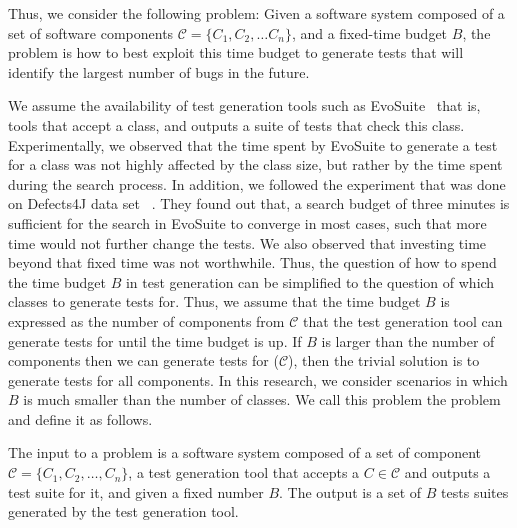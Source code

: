 
Thus, we consider the following problem: Given a software system
composed of a set of software components $\mathcal{C}=\{C_1, C_2, \ldots C_n\}$,
and a fixed-time budget $B$, the problem is how to best exploit this time budget
to generate tests that will identify the largest number of bugs in the future.

We assume the availability of test generation tools such as EvoSuite~\cite{fraser2011evosuite}
that is, tools that accept a class, and outputs a suite of tests
that check this class. Experimentally, we observed that the time spent by
EvoSuite to generate a test for a class was not highly affected by the class
size, but rather by the time spent during the search process. 
In addition, we followed the experiment that was done on Defects4J data set ~\cite{shamshiri2015automatically}. They found out that, a search budget of three minutes is sufficient for the search in EvoSuite to converge in most cases, such that more time would not further change the tests. We also observed that investing time beyond that fixed time was not worthwhile. Thus, the question of how to
spend the time budget $B$ in test generation can be simplified to the question
of which classes to generate tests for. Thus, we assume that the time budget $B$
is expressed as the number of components from $\mathcal{C}$ that the test
generation tool can generate tests for until the time budget is up. If $B$ is
larger than the number of components then we can generate tests for
($\mathcal{C}$), then the trivial solution is to generate tests for all
components. In this research, we consider scenarios in which $B$ is much smaller
than the number of classes. We call this problem
the \btg problem and define it as follows.



\begin{definition}
The input to a \btg problem is a software system composed
of a set of component $\mathcal{C}=\{C_1, C_2, \ldots, C_n\}$, a test generation tool
that accepts a $C\in \mathcal{C}$ and outputs a test suite for it, and given a
fixed number $B$. The output is a set of $B$ tests suites generated by the test
generation tool.
\end{definition}


